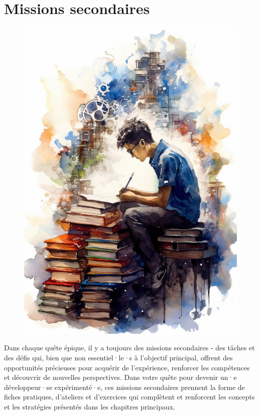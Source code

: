 \part*{Missions secondaires}
\markboth{}{}
\setcounter{tocdepth}{1}
\setcounter{chapter}{0}

\begin{figure}[H]
    \center
    \includegraphics[keepaspectratio, width=\textwidth, height=\textheight]{images/126f5f0d-935d-46c2-b04d-e7f65df91a82.png}
\end{figure}

Dans chaque quête épique, il y a toujours des missions secondaires - des tâches et des défis qui, bien que non essentiel·le·s à l'objectif principal, offrent des opportunités précieuses pour acquérir de l'expérience, renforcer les compétences et découvrir de nouvelles perspectives. Dans votre quête pour devenir un·e développeur·se expérimenté·e, ces missions secondaires prennent la forme de fiches pratiques, d'ateliers et d'exercices qui complètent et renforcent les concepts et les stratégies présentés dans les chapitres principaux.

